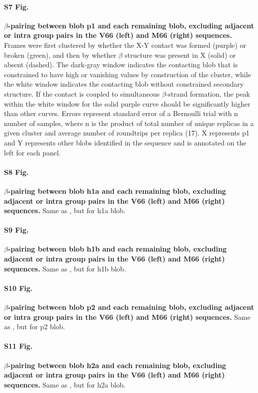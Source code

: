 \documentclass[10pt,letterpaper]{article}
\begin{document}
\paragraph*{S7 Fig.}
\label{S7_Fig}
{\bf $\beta$-pairing between blob p1 and each remaining blob, excluding adjacent or intra group pairs in the V66 (left) and M66 (right) sequences.} 
Frames were first clustered by whether the X-Y contact was formed (purple) or broken (green), and then by whether $\beta$ structure was present in X (solid) or absent (dashed). The dark-gray window indicates the contacting blob that is constrained to have high or vanishing values by construction of the cluster, while the white window indicates the contacting blob without constrained secondary structure. If the contact is coupled to simultaneous $\beta$-strand formation, the peak within the white window for the solid purple curve should be significantly higher than other curves. Errors represent standard error of a Bernoulli trial with n number of samples, where n is the product of total number of unique replicas in a given cluster and average number of roundtrips per replica (17). X represents p1 and Y represents other blobs identified in the sequence and is annotated on the left for each panel.

\paragraph*{S8 Fig.}
\label{S8_Fig}
{\bf $\beta$-pairing between blob h1a and each remaining blob, excluding adjacent or intra group pairs in the V66 (left) and M66 (right) sequences.} Same as , but for h1a blob.

\paragraph*{S9 Fig.}
\label{S9_Fig}
{\bf $\beta$-pairing between blob h1b and each remaining blob, excluding adjacent or intra group pairs in the V66 (left) and M66 (right) sequences.} Same as , but for h1b blob.

\paragraph*{S10 Fig.}
\label{S10_Fig}
{\bf $\beta$-pairing between blob p2 and each remaining blob, excluding adjacent or intra group pairs in the V66 (left) and M66 (right) sequences.} Same as , but for p2 blob.

\paragraph*{S11 Fig.}
\label{S11_Fig}
{\bf $\beta$-pairing between blob h2a and each remaining blob, excluding adjacent or intra group pairs in the V66 (left) and M66 (right) sequences.} Same as , but for h2a blob.
\end{document}

